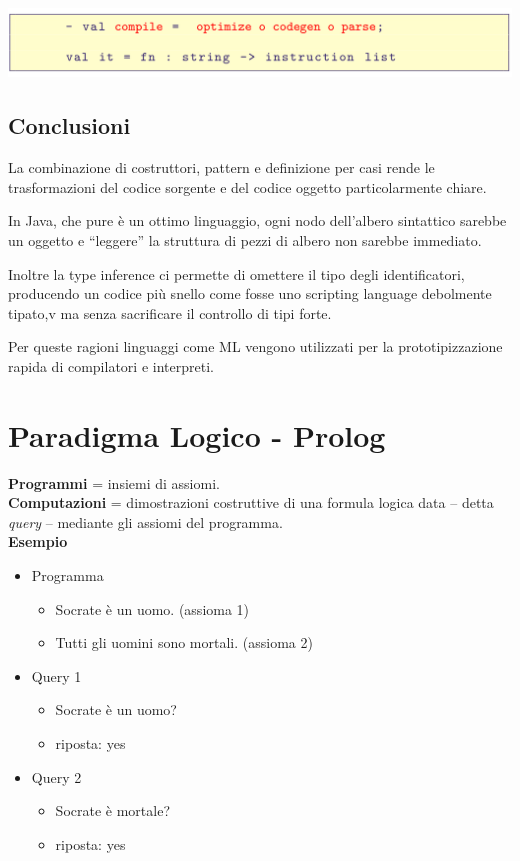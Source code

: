 \documentclass[10pt]{article}
\begin{document}
\includegraphics[scale=0.3]{Immagini/comp7.png}
\subsection{Conclusioni}
La combinazione di costruttori, pattern e definizione per casi
rende le trasformazioni del codice sorgente e del codice oggetto
particolarmente chiare. 

In Java, che pure è un ottimo linguaggio, ogni nodo
dell’albero sintattico sarebbe un oggetto e “leggere” la
struttura di pezzi di albero non sarebbe immediato.

Inoltre la type inference ci permette di omettere il tipo degli
identificatori, producendo un codice più snello come fosse uno scripting language debolmente tipato,v ma senza sacrificare il controllo di tipi forte.

Per queste ragioni linguaggi come ML vengono utilizzati per la
prototipizzazione rapida di compilatori e interpreti.

\section{Paradigma Logico - Prolog}
\textbf{Programmi} = insiemi di assiomi.
\\
\textbf{Computazioni} = dimostrazioni costruttive di una formula logica
data – detta \textit{query} – mediante gli assiomi del programma.
\\
\textbf{Esempio}
\begin{itemize}
    \item Programma
    \begin{itemize}
        \item Socrate è un uomo. (assioma 1)
        \item Tutti gli uomini sono mortali. (assioma 2)
    \end{itemize}
    \item Query 1
    \begin{itemize}
        \item Socrate è un uomo?
        \item riposta: yes
    \end{itemize}
    \item Query 2
    \begin{itemize}
        \item Socrate è mortale?
        \item riposta: yes
    \end{itemize}
\end{itemize}
\end{document}
